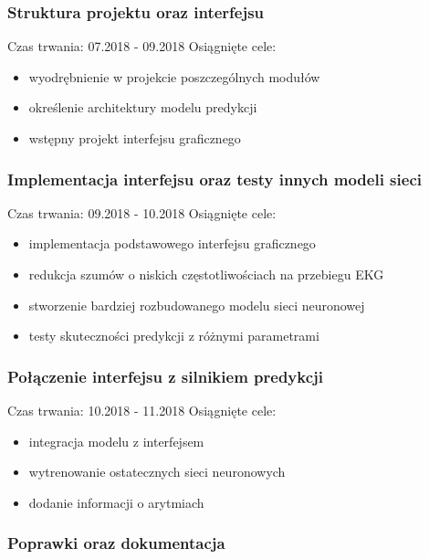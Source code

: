 \documentclass[polish,12pt]{aghthesis}
\begin{document}
\subsubsection{Struktura projektu oraz interfejsu}

Czas trwania: 07.2018 - 09.2018
\newline
Osiągnięte cele:
\begin{itemize}
	\item wyodrębnienie w projekcie poszczególnych modułów
	\item określenie architektury modelu predykcji
	\item wstępny projekt interfejsu graficznego
\end{itemize}

\subsubsection{Implementacja interfejsu oraz testy innych modeli sieci}

Czas trwania: 09.2018 - 10.2018
\newline
Osiągnięte cele:
\begin{itemize}
	\item implementacja podstawowego interfejsu graficznego
	\item redukcja szumów o niskich częstotliwościach na przebiegu EKG
	\item stworzenie bardziej rozbudowanego modelu sieci neuronowej
	\item testy skuteczności predykcji z różnymi parametrami
\end{itemize}

\subsubsection{Połączenie interfejsu z silnikiem predykcji}

Czas trwania: 10.2018 - 11.2018
\newline
Osiągnięte cele:
\begin{itemize}
	\item integracja modelu z interfejsem
	\item wytrenowanie ostatecznych sieci neuronowych
	\item dodanie informacji o arytmiach
\end{itemize}

\subsubsection{Poprawki oraz dokumentacja}
\end{document}
